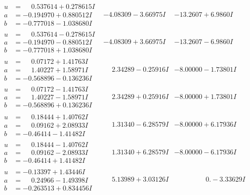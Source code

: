 \documentclass[1p]{elsarticle_modified}
\theoremstyle{definition}
\begin{document}
$$\begin{array}{c|c|c}
\begin{aligned}
u &= \phantom{-}0.537614 + 0.278615 I \\
a &= -0.194970 + 0.880512 I \\
b &= -0.777018 - 1.038680 I\end{aligned}
 & -4.08309 - 3.66975 I & -13.2607 + 6.9860 I \\ \hline\begin{aligned}
u &= \phantom{-}0.537614 - 0.278615 I \\
a &= -0.194970 - 0.880512 I \\
b &= -0.777018 + 1.038680 I\end{aligned}
 & -4.08309 + 3.66975 I & -13.2607 - 6.9860 I \\ \hline\begin{aligned}
u &= \phantom{-}0.07172 + 1.41763 I \\
a &= \phantom{-}1.40227 + 1.58971 I \\
b &= -0.568896 - 0.136236 I\end{aligned}
 & \phantom{-}2.34289 - 0.25916 I & -8.00000 - 1.73801 I \\ \hline\begin{aligned}
u &= \phantom{-}0.07172 - 1.41763 I \\
a &= \phantom{-}1.40227 - 1.58971 I \\
b &= -0.568896 + 0.136236 I\end{aligned}
 & \phantom{-}2.34289 + 0.25916 I & -8.00000 + 1.73801 I \\ \hline\begin{aligned}
u &= \phantom{-}0.18444 + 1.40762 I \\
a &= \phantom{-}0.09162 + 2.08933 I \\
b &= -0.46414 - 1.41482 I\end{aligned}
 & \phantom{-}1.31340 - 6.28579 I & -8.00000 + 6.17936 I \\ \hline\begin{aligned}
u &= \phantom{-}0.18444 - 1.40762 I \\
a &= \phantom{-}0.09162 - 2.08933 I \\
b &= -0.46414 + 1.41482 I\end{aligned}
 & \phantom{-}1.31340 + 6.28579 I & -8.00000 - 6.17936 I \\ \hline\begin{aligned}
u &= -0.13397 + 1.43446 I \\
a &= \phantom{-}0.24966 - 1.49398 I \\
b &= -0.263513 + 0.834456 I\end{aligned}
 & \phantom{-}5.13989 + 3.03126 I & \phantom{-0.000000 } 0. - 3.33629 I \\ \hline\begin{aligned}

\end{aligned}
\end{array}$$
\end{document}
